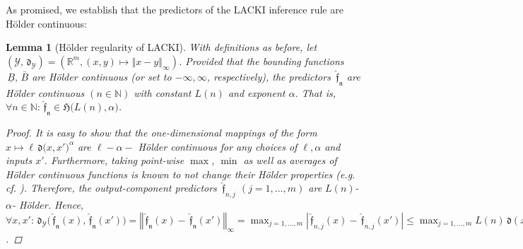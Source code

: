 \documentclass{article} %
\newtheorem{lem}[thm]{Lemma}
\theoremstyle{definition}
\theoremstyle{remark}
\newcommand{\norm}[1]{\left\Vert#1\right\Vert}
\newcommand{\abs}[1]{\left\vert#1\right\vert}
\newcommand{\Real}{\mathbb R}
\newcommand{\nat}{\mathbb N}
\newcommand{\outspace}{\ensuremath{ \mathcal Y}}
\newcommand{\metric}{\, \mathfrak{d}} %
\newcommand{\Metrici}[2]{\metric\bigl(#1,#2\bigr) }
\newcommand{\Metrico}[2]{\metric_\outspace\bigl(#1,#2\bigr) }
\newcommand{\predf}{\, \mathfrak{  \hat f}} %
\newcommand{\predfn}{\, \mathfrak{  \hat f_n}} %
\newcommand{\hexp}{{ \alpha }}%
\newcommand{\ubf}{\, {\bar B}} %
\newcommand{\lbf}{\, {\underline{B}}} %
\newcommand{\Hoelset}{\mathfrak{H}}
\begin{document}
As promised, we establish that the predictors of the LACKI inference rule are H\"older continuous:
\begin{lem}[H\"older regularity of LACKI]
With definitions as before, let $(\outspace,\metric_\outspace) = (\Real^m,(x,y) \mapsto \norm{x-y}_\infty)$.
Provided that the bounding functions $\lbf,\ubf$ are H\"older continuous (or set to $-\infty,\infty$, respectively),
the predictors $\predfn$ are H\"older continuous $(n \in \nat)$ with constant $L(n)$ and exponent $\hexp$. That is, $\forall n \in \nat: \predfn \in \Hoelset \bigl(L(n),\hexp\bigr)$.

\begin{proof}
It is easy to show that the one-dimensional mappings of the form $x \mapsto \ell \Metrici{x}{x'}^\hexp$ are $\ell-\hexp-$ H\"older continuous for any choices of $\ell,\hexp$ and inputs $x'$. Furthermore, taking point-wise $\max$, $\min$ as well as averages of H\"older continuous functions is known to not change their H\"older properties (e.g. cf. \cite{calliess2014_thesis}). Therefore, the output-component predictors  $\predf_{n,j}$ $(j=1,...,m)$ are $L(n)$-$\hexp$- H\"older. 
Hence, $\forall x,x': \Metrico{\predfn(x)}{\predfn(x')} = \norm{\predfn(x) - \predfn(x')}_\infty = \max_{j=1,...,m} \abs{\predf_{n,j}(x) - \predf_{n,j}(x')} \leq \max_{j=1,...,m} L(n) \metric(x,x')^\hexp = L(n) \metric(x,x')^\hexp$.
\end{proof} 
\label{lem:LACKIpredHoelder}
\end{lem} 
\end{document}
